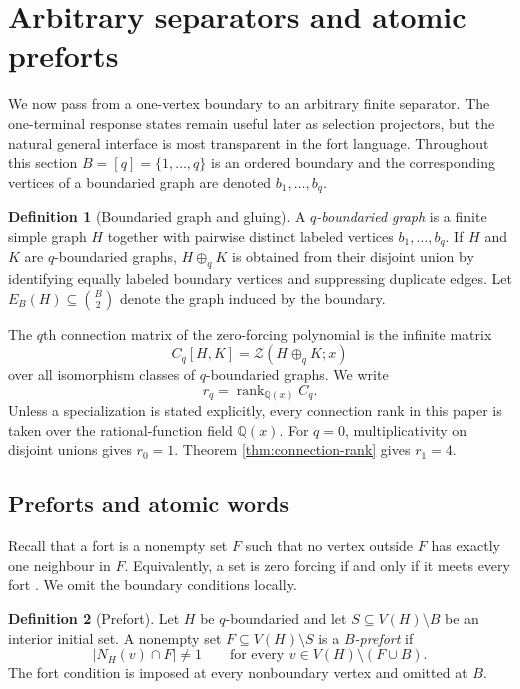 \documentclass[11pt,reqno]{amsart}
\theoremstyle{definition}
\newtheorem{definition}[definition]{Definition}
\newcommand{\Zpoly}{\mathcal Z}
\begin{document}
\section{Arbitrary separators and atomic preforts}\label{sec:separator-preforts}

We now pass from a one-vertex boundary to an arbitrary finite separator.  The
one-terminal response states remain useful later as selection projectors, but
the natural general interface is most transparent in the fort language.
Throughout this section $B=[q]=\{1,\ldots,q\}$ is an ordered boundary and the
corresponding vertices of a boundaried graph are denoted $b_1,\ldots,b_q$.

\begin{definition}[Boundaried graph and gluing]\label{def:q-boundaried}
A \emph{$q$-boundaried graph} is a finite simple graph $H$ together with
pairwise distinct labeled vertices $b_1,\ldots,b_q$.  If $H$ and $K$ are
$q$-boundaried graphs, $H\oplus_q K$ is obtained from their disjoint union by
identifying equally labeled boundary vertices and suppressing duplicate edges.
Let $E_B(H)\subseteq\binom{B}{2}$ denote the graph induced by the boundary.
\end{definition}

The $q$th connection matrix of the zero-forcing polynomial is the infinite
matrix
\[
  C_q[H,K]=\Zpoly(H\oplus_q K;x)
\]
over all isomorphism classes of $q$-boundaried graphs.  We write
\[
  r_q=\operatorname{rank}_{\mathbb Q(x)}C_q.
\]
Unless a specialization is stated explicitly, every connection rank in this
paper is taken over the rational-function field $\mathbb Q(x)$.
For $q=0$, multiplicativity on disjoint unions gives $r_0=1$.  Theorem
\ref{thm:connection-rank} gives $r_1=4$.

\subsection{Preforts and atomic words}

Recall that a fort is a nonempty set $F$ such that no vertex outside $F$ has
exactly one neighbour in $F$.  Equivalently, a set is zero forcing if and only
if it meets every fort \cite{AIM2008}.  We omit the boundary conditions locally.

\begin{definition}[Prefort]\label{def:prefort}
Let $H$ be $q$-boundaried and let
$S\subseteq V(H)\setminus B$ be an interior initial set.  A nonempty set
$F\subseteq V(H)\setminus S$ is a \emph{$B$-prefort} if
\[
 |N_H(v)\cap F|\ne1
 \qquad\text{for every }v\in V(H)\setminus(F\cup B).
\]
The fort condition is imposed at every nonboundary vertex and omitted at
$B$.
\end{definition}
\end{document}
